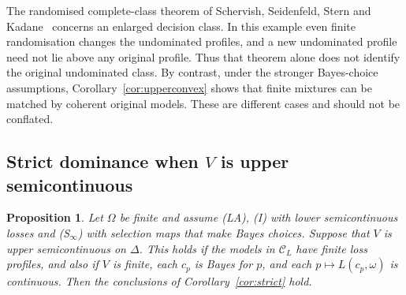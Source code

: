 \documentclass[11pt]{article}
\newtheorem{proposition}[theorem]{Proposition}
\theoremstyle{definition}
\theoremstyle{remark}
\newcommand{\C}{\mathcal C}
\begin{document}
The randomised complete-class theorem of Schervish, Seidenfeld, Stern and Kadane~\cite[Theorem~1]{SSSK} concerns an enlarged decision class. In this example even finite randomisation changes the undominated profiles, and a new undominated profile need not lie above any original profile. Thus that theorem alone does not identify the original undominated class. By contrast, under the stronger Bayes-choice assumptions, Corollary~\ref{cor:upperconvex} shows that finite mixtures can be matched by coherent original models. These are different cases and should not be conflated.

\subsection{Strict dominance when \texorpdfstring{$V$}{V} is upper semicontinuous}\label{sec:strictproof}
\begin{proposition}\label{prop:strict-general}
Let $\Omega$ be finite and assume (LA), (I) with lower semicontinuous losses and (S$_\infty$) with selection maps that make Bayes choices. Suppose that $V$ is upper semicontinuous on $\Delta$. This holds if the models in $\C_L$ have finite loss profiles, and also if $V$ is finite, each $c_p$ is Bayes for $p$, and each $p\mapsto L(c_p,\omega)$ is continuous. Then the conclusions of Corollary~\ref{cor:strict} hold.
\end{proposition}
\end{document}
